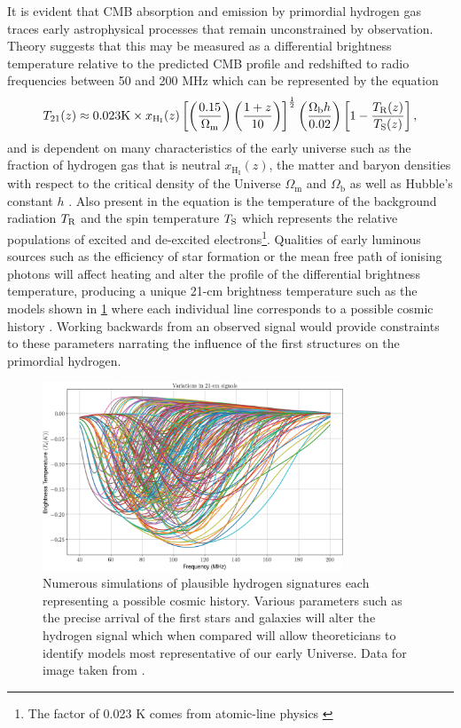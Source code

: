 It is evident that CMB absorption and emission by primordial hydrogen gas traces early astrophysical processes that remain unconstrained by observation. Theory suggests that this may be measured as a differential brightness temperature relative to the predicted CMB profile and redshifted to radio frequencies between 50 and 200 MHz which can be represented by the equation
\begin{equation}
    \label{diffBright}
    T_{\mathrm{21}} (z) \approx 0.023 \mathrm{K} \times x_{ \mathrm{H}_{\mathrm{I}} }(z) \left[ \left( \frac{0.15}{ \Omega_{\mathrm{m}} } \right) \left( \frac{ 1+z }{10} \right) \right]^{ \frac{1}{2} } \left( \frac{ \Omega_{ \mathrm{b}} h}{0.02} \right) \left[ 1 - \frac{ T_{\mathrm{R}}(z) }{ T_{\mathrm{S}}(z) } \right],
\end{equation}
and is dependent on many characteristics of the early universe such as the fraction of hydrogen gas that is neutral $x_{ \mathrm{H}_{\mathrm{I}} }(z)$, the matter and baryon densities with respect to the critical density of the Universe $\Omega_\mathrm{m}$ and $\Omega_\mathrm{b}$ as well as Hubble’s constant $h$ \citep{edgesNature}. Also present in the equation is the temperature of the background radiation $T_{\mathrm{R}}$ and the spin temperature $T_{\mathrm{S}}$ which represents the relative populations of excited and de-excited electrons\footnote{The factor of 0.023 K comes from atomic-line physics \citep{edgesNature}}. Qualities of early luminous sources such as the efficiency of star formation or the mean free path of ionising photons will affect heating and alter the profile of the differential brightness temperature, producing a unique 21-cm brightness temperature such as the models shown in \cref{fig:21cm_models} where each individual line corresponds to a possible cosmic history \citep{theory_models}. Working backwards from an observed signal would provide constraints to these parameters narrating the influence of the first structures on the primordial hydrogen.
\begin{figure}
    \centering
    \includegraphics[width=0.8\textwidth]{21cm_models}
    \caption{Numerous simulations of plausible hydrogen signatures each representing a possible cosmic history. Various parameters such as the precise arrival of the first stars and galaxies will alter the hydrogen signal which when compared will allow theoreticians to identify models most representative of our early Universe. Data for image taken from \citet{theory_models}.}
    \label{fig:21cm_models}
\end{figure}


